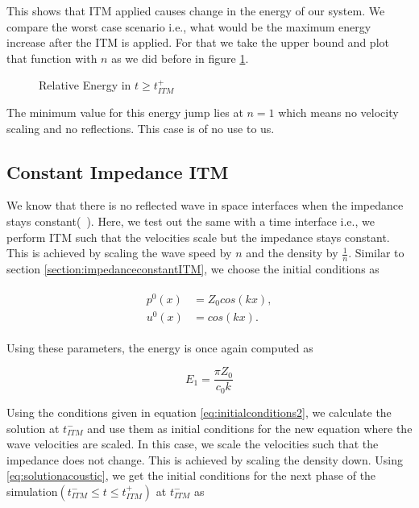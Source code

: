 This shows that \ac{ITM} applied causes change in the energy of our system. We compare the worst case scenario i.e., what would be the maximum energy increase after the ITM is applied. For that we take the upper bound and plot that function with $n$ as we did before in figure \ref{fig:ratio2}.

\begin{figure}
    \centering
    \caption{Relative Energy in $t \geq t_{ITM}^+$}
    \label{fig:ratio2}
\end{figure}

The minimum value for this energy jump lies at $n=1$ which means no velocity scaling and no reflections. This case is of no use to us.

\subsection{Constant Impedance \ac{ITM}}
We know that there is no reflected wave in space interfaces when the impedance stays constant(~\parencite[Sec 9.7]{leveque_2002}). Here, we test out the same with a time interface i.e., we perform \ac{ITM} such that the velocities scale but the impedance stays constant. This is achieved by scaling the wave speed by $n$ and the density by $\frac{1}{n}$.
Similar to section \ref{section:impedanceconstantITM}, we choose the initial conditions as

\begin{align}
    \begin{split}
        p^0\left(x\right) &= Z_0cos\left(kx\right), \\
        u^0\left(x\right) &= cos\left(kx\right) .
    \end{split}
    \label{eq:initialconditions2}
\end{align}

Using these parameters, the energy is once again computed as

\begin{equation}
    E_1 = \frac{\pi Z_0}{c_0 k}
\end{equation}

Using the conditions given in equation \ref{eq:initialconditions2}, we calculate the solution at $t_{ITM}^-$ and use them as initial conditions for the new equation where the wave velocities are scaled.
In this case, we scale the velocities such that the impedance does not change. This is achieved by scaling the density down. Using \ref{eq:solutionacoustic}, we get the initial conditions for the next phase of the simulation$\left(t_{ITM}^- \leq t \leq t_{ITM}^+ \right)$ at $t_{ITM}^-$ as

